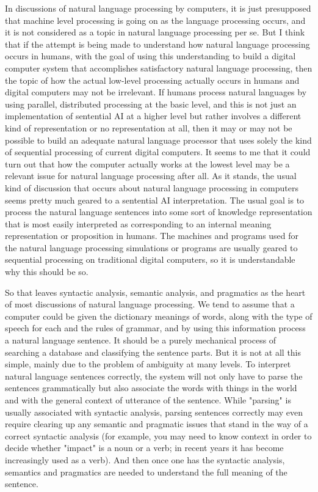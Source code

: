 In discussions of natural language processing by computers, it is just presupposed that machine level processing is going on as the language processing occurs, and it is not considered as a topic in natural language processing per se. But I think that if the attempt is being made to understand how natural language processing occurs in humans, with the goal of using this understanding to build a digital computer system that accomplishes satisfactory natural language processing, then the topic of how the actual low-level processing actually occurs in humans and digital computers may not be irrelevant. If humans process natural languages by using parallel, distributed processing at the basic level, and this is not just an implementation of sentential AI at a higher level but rather involves a different kind of representation or no representation at all, then it may or may not be possible to build an adequate natural language processor that uses solely the kind of sequential processing of current digital computers. It seems to me that it could turn out that how the computer actually works at the lowest level may be a relevant issue for natural language processing after all. As it stands, the usual kind of discussion that occurs about natural language processing in computers seems pretty much geared to a sentential AI interpretation. The usual goal is to process the natural language sentences into some sort of knowledge representation that is most easily interpreted as corresponding to an internal meaning representation or proposition in humans. The machines and programs used for the natural language processing simulations or programs are usually geared to sequential processing on traditional digital computers, so it is understandable why this should be so.

So that leaves syntactic analysis, semantic analysis, and pragmatics as the heart of most discussions of natural language processing. We tend to assume that a computer could be given the dictionary meanings of words, along with the type of speech for each and the rules of grammar, and by using this information process a natural language sentence. It should be a purely mechanical process of searching a database and classifying the sentence parts. But it is not at all this simple, mainly due to the problem of ambiguity at many levels. To interpret natural language sentences correctly, the system will not only have to parse the sentences grammatically but also associate the words with things in the world and with the general context of utterance of the sentence. While "parsing" is usually associated with syntactic analysis, parsing sentences correctly may even require clearing up any semantic and pragmatic issues that stand in the way of a correct syntactic analysis (for example, you may need to know context in order to decide whether "impact" is a noun or a verb; in recent years it has become increasingly used as a verb). And then once one has the syntactic analysis, semantics and pragmatics are needed to understand the full meaning of the sentence.

